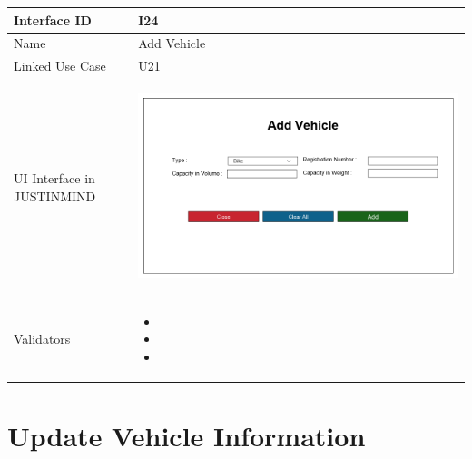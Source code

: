 \documentclass[12pt,a4paper]{report}
\begin{document}
\begin{tabular}{ | m{3cm} | m{12cm}| } \hline

Interface ID & I24  \\\hline

Name  &  Add Vehicle \\ \hline

Linked Use Case & U21	 \\ \hline

UI Interface in JUSTINMIND & \begin{center} \includegraphics[scale=0.3]{./User Interface/UI-023 AddVehicle@1x.png}\end{center}  \\ \hline

Validators & 
\begin{itemize}
\item   
\item  
\item 


\end{itemize}
\\ \hline
\end{tabular} 
\section{Update Vehicle Information}
\end{document}
